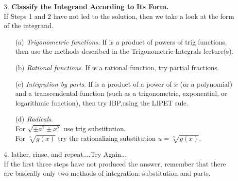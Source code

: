  \begin{frame}
 \begin{enumerate}
\item[3.] \textbf{Classify the Integrand According to Its Form.}\\
 If Steps 1 and 2 have not led to the
solution, then we take a look at the form of the integrand.\\
\begin{enumerate} \pause 
\item[(a)]  \textit{Trigonometric functions}. If is a product of powers of trig functions, then use the methods described in the Trigonometric Integrals lecture(s). \pause 
\item[(b)] \textit{Rational functions}. If is a rational function, try partial fractions.
\pause 
\item[(c)] \textit{Integration by parts}. If is a product of a power of $ x $ (or a polynomial) and a transcendental function (such as a trigonometric, exponential, or logarithmic function), then try IBP,using the LIPET rule.  
\pause 
\item[(d)] \textit{Radicals}. \\
For $ \sqrt{\pm a^2 \pm x^2} $ use trig substitution.\\
For $ \sqrt[n]{g(x)} $ try the rationalizing substitution $ u= \sqrt[n]{g(x)}. $
\pause 
\end{enumerate} 
 \item[4.] lather, rinse, and repeat....Try Again...\\
 
 If the first three steps have not produced the answer, remember that
 there are basically only two methods of integration: substitution and parts.
\end{enumerate}

\end{frame}


